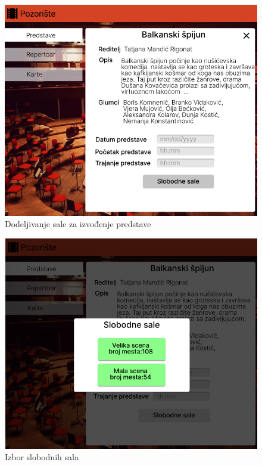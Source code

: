 \documentclass[a4paper]{article}
\begin{document}
\begin{figure}[H]
  \begin{center}
    \includegraphics[width=130mm]{../images/organizator_dodeljivanje_sale.png}
  \end{center}
  \caption{Dodeljivanje sale za izvođenje predstave}
  \label{organizator_dodeljivanje_sale}
\end{figure}

\begin{figure}[H]
  \begin{center}
    \includegraphics[width=130mm]{../images/organizator_izbor_sala.png}
  \end{center}
  \caption{Izbor slobodnih sala}
  \label{organizator_izbor_sala}
\end{figure}
\end{document}
